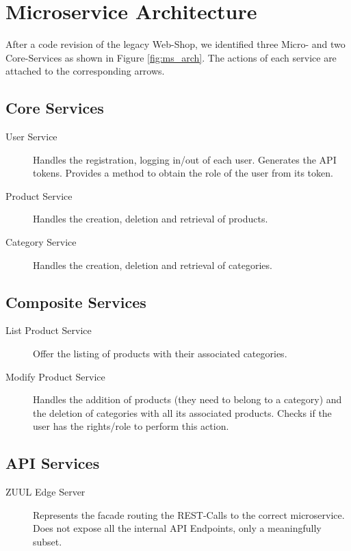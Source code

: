 \documentclass[11pt]{article}
\begin{document}
	
	\section{Microservice Architecture}
	 After a code revision of the legacy Web-Shop, we identified three Micro- and two Core-Services as shown in Figure \ref{fig:ms_arch}. 
	The actions of each service are attached to the corresponding arrows.
	\subsection{Core Services}
		\begin{description}
			\item[User Service] Handles the registration, logging in/out of each user. Generates the API tokens. Provides a method to obtain the role of the user from its token.
			\item[Product Service] Handles the creation, deletion and retrieval of products.
			\item[Category Service] Handles the creation, deletion and retrieval of categories.
		\end{description}
	\subsection{Composite Services}
		\begin{description}
			\item[List Product Service] Offer the listing of products with their associated categories.
			\item[Modify Product Service] Handles the addition of products (they need to belong to a category) and the deletion of categories with all its associated products. Checks if the user has the rights/role to perform this action.
		\end{description}
	\subsection{API Services}
		\begin{description}
			\item[ZUUL Edge Server] Represents the facade routing the REST-Calls to the correct microservice. Does not expose all the internal API Endpoints, only a meaningfully subset.
		\end{description}
	
\end{document}
